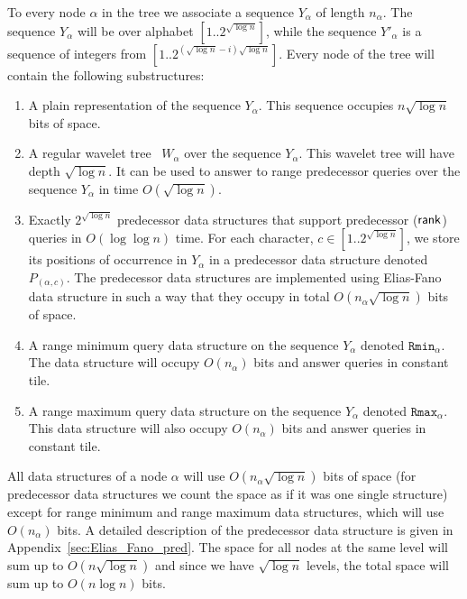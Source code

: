 \documentclass[11pt,runningheads]{llncs}
\def\rank{\mbox{\rm {\sf rank}}}
\begin{document}
To every node $\alpha$ in the tree we associate 
a sequence $Y_\alpha$ of length $n_\alpha$. 
The sequence $Y_\alpha$ will be over alphabet $[1..2^{\sqrt{\log n}}]$,  
while the sequence $Y'_\alpha$ is a sequence of integers from $[1..2^{(\sqrt{\log n}-i)\sqrt{\log n}}]$. 
Every node of the tree will contain the following substructures: 
\begin{enumerate}
\item A plain representation of the sequence $Y_\alpha$. This sequence occupies $n\sqrt{\log n}$ bits of space. 
\item A regular wavelet tree~\cite{GGV03} $W_{\alpha}$ over the sequence $Y_\alpha$. This wavelet tree will have 
depth $\sqrt{\log n}$. It can be used to answer to range predecessor queries over the sequence $Y_\alpha$
in time $O(\sqrt{\log n})$. 
\item Exactly $2^{\sqrt{\log n}}$ predecessor data structures that support 
predecessor ($\rank$) queries in $O(\log\log n)$ time. For each character, $c\in[1..2^{\sqrt{\log n}}]$, 
we store its positions of occurrence in $Y_\alpha$ in a predecessor data structure
denoted $P_{(\alpha,c)}$. The predecessor data structures are implemented using Elias-Fano 
data structure in such a way that they occupy in total $O(n_\alpha\sqrt{\log n})$ bits of space. 
\item A range minimum query data structure on the sequence $Y_\alpha$ denoted $\mathtt{Rmin}_\alpha$. 
The data structure will occupy $O(n_\alpha)$ bits and answer queries in constant tile. 
\item A range maximum query data structure on the sequence $Y_\alpha$ denoted $\mathtt{Rmax}_\alpha$.
This data structure will also occupy $O(n_\alpha)$ bits and answer queries in constant tile. 
\end{enumerate}
All data structures of a node $\alpha$ will use $O(n_\alpha\sqrt{\log n})$ bits 
of space  (for predecessor data structures we count the space as if it was 
one single structure)
except for range minimum and range maximum 
data structures, which will use $O(n_\alpha)$ bits. 
A detailed description of the predecessor data structure 
is given in Appendix~\ref{sec:Elias_Fano_pred}. The space for all nodes 
at the same level will sum up to $O(n\sqrt{\log n})$ and since we have 
$\sqrt{\log n}$ levels, the total space will sum up to $O(n\log n)$
bits. 
\end{document}
